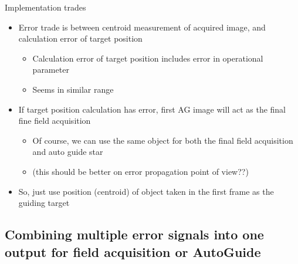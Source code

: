 \documentclass[a4paper,notitlepage]{article}
\begin{document}
Implementation trades
\begin{itemize}
  \item Error trade is between centroid measurement of acquired image, and calculation error of target position
  \begin{itemize}
    \item Calculation error of target position includes error in operational parameter
    \item Seems in similar range
  \end{itemize}
  \item If target position calculation has error, first AG image will act as the final fine field acquisition
  \begin{itemize}
    \item Of course, we can use the same object for both the final field acquisition and auto guide star
    \item (this should be better on error propagation point of view??)
  \end{itemize}
  \item So, just use position (centroid) of object taken in the first frame as the guiding target
\end{itemize}

\subsection{Combining multiple error signals into one output for field acquisition or AutoGuide}
\end{document}
